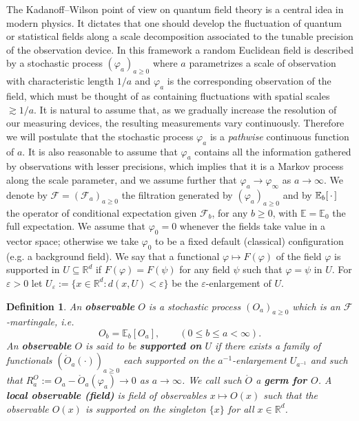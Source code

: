 \documentclass[reprint,aps]{revtex4-2}
\newcommand{\assign}{:=}
\newcommand{\cdummy}{\cdot}
\newcommand{\tmem}[1]{{\em #1\/}}
\newcommand{\tmtextbf}[1]{\textbf{{{#1}}}}
\newtheorem{definition}{Definition}
\newcommand{\bbE}{\mathbb{E}}
\begin{document}
The Kadanoff--Wilson point of view on quantum field theory is a central idea
in modern physics. It dictates that one should develop the fluctuation of
quantum or statistical fields along a scale decomposition associated to the
tunable precision of the observation device. In this framework a random
Euclidean field is described by a stochastic process $(\varphi_a)_{a \geqslant
0}$ where $a$ parametrizes a scale of observation with characteristic length
$1 / a$ and $\varphi_a$ is the corresponding observation of the field, which
must be thought of as containing fluctuations with spatial scales $\gtrsim 1 /
a$. It is natural to assume that, as we gradually increase the resolution of
our measuring devices, the resulting measurements vary continuously. Therefore
we will postulate that the stochastic process $\varphi_a$ is a
{\tmem{pathwise}} continuous function of $a$. It is also reasonable to assume
that $\varphi_a$ contains all the information gathered by observations with
lesser precisions, which implies that it is a Markov process along the scale
parameter, and we assume further that $\varphi_a \rightarrow \varphi_{\infty}$
as $a \rightarrow \infty$. We denote by $\mathscr{F} = (\mathscr{F}_a)_{a
\geqslant 0}$ the filtration generated by $(\varphi_a)_{a \geqslant 0}$ and by
$\bbE_b [\hspace{0.17em} \cdummy \hspace{0.17em}]$ the operator of conditional
expectation given $\mathscr{F}_b$, for any $b \geqslant 0$, with
$\mathbb{E}=\mathbb{E}_0$ the full expectation. We assume that $\varphi_0 = 0$
whenever the fields take value in a vector space; otherwise we take
$\varphi_0$ to be a fixed default (classical) configuration (e.g. a background
field). We say that a functional $\varphi \mapsto F (\varphi)$ of the field
$\varphi$ is supported in $U \subseteq \mathbb{R}^d$ if $F (\varphi) = F
(\psi)$ for any field $\psi$ such that $\varphi = \psi$ in $U$. For
$\varepsilon > 0$ let $U_{\varepsilon} \assign \{ x \in \mathbb{R}^d : d (x,
U) < \varepsilon \}$ be the $\varepsilon$-enlargement of $U$.

\begin{definition}
  \label{def:obs}An \tmtextbf{observable} $O$ is a stochastic process
  $(O_a)_{a \geqslant 0}$ which is an $\mathscr{F}$-martingale, i.e.
  \[ O_b = \bbE_b [O_a], \qquad (0 \leqslant b \leqslant a < \infty) . \]
  An \tmtextbf{observable} $O$ is said to be \tmtextbf{supported on} $U$ if
  there exists a family of functionals $(\ring{O}_a (\cdot))_{a \geqslant 0}$
  each supported on the $a^{- 1}$-enlargement $U_{a^{- 1}}$ and such that
  $R_a^O \assign O_a - \ring{O}_a (\varphi_a) \rightarrow 0$ as $a \rightarrow
  \infty$. We call such $\ring{O}$ a \tmtextbf{germ for $O$}. A
  \tmtextbf{local observable (field)} is field of observables $x \mapsto O
  (x)$ such that the observable $O (x)$ is supported on the singleton $\{x\}$
  for all $x \in \mathbb{R}^d$.
\end{definition}
\end{document}
